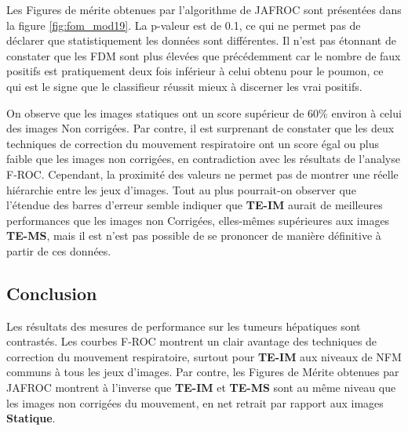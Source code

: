 Les Figures de mérite obtenues par l'algorithme de JAFROC sont présentées dans la figure \ref{fig:fom_mod19}. La p-valeur est de 0.1, ce qui ne permet pas de déclarer que statistiquement les données sont différentes.
Il n'est pas étonnant de constater que les FDM sont plus élevées que précédemment car le nombre de faux positifs est pratiquement deux fois inférieur à celui obtenu pour le poumon, ce qui est le signe que le classifieur réussit mieux à discerner les vrai positifs.

On observe que les images statiques ont un score supérieur de 60\% environ à celui des images Non corrigées. Par contre, il est surprenant de constater que les deux techniques de correction du mouvement respiratoire ont un score égal ou plus faible que les images non corrigées, en contradiction avec les résultats de l'analyse F-ROC. Cependant, la proximité des valeurs ne permet pas de montrer une réelle hiérarchie entre les jeux d'images. Tout au plus pourrait-on observer que l'étendue des barres d'erreur semble indiquer que \textbf{TE-IM} aurait de meilleures performances que les images non Corrigées, elles-mêmes supérieures aux images \textbf{TE-MS}, mais il est n'est pas possible de se prononcer de manière définitive à partir de ces données. 




\subsection{Conclusion}

Les résultats des mesures de performance sur les tumeurs hépatiques sont contrastés. Les courbes F-ROC montrent un clair avantage des techniques de correction du mouvement respiratoire, surtout pour \textbf{TE-IM} aux niveaux de NFM communs à tous les jeux d'images. Par contre, les Figures de Mérite obtenues par JAFROC montrent à l'inverse que \textbf{TE-IM} et \textbf{TE-MS} sont au même niveau que les images non corrigées du mouvement, en net retrait par rapport aux images \textbf{Statique}.





